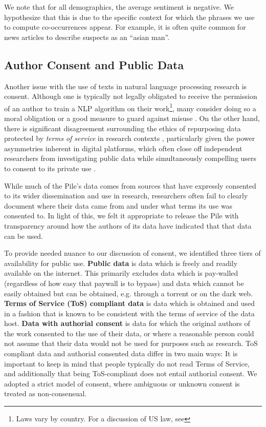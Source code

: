 \documentclass[11pt,a4paper]{article}
\begin{document}
We note that for all demographics, the average sentiment is negative. We hypothesize that this is due to the specific context for which the phrases we use to compute co-occurrences appear. For example, it is often quite common for news articles to describe suspects as an ``asian man''.


\subsection{Author Consent and Public Data}

Another issue with the use of texts in natural language processing research is consent. Although one is typically not legally obligated to receive the permission of an author to train a NLP algorithm on their work\footnote{Laws vary by country. For a discussion of US law, see }, many consider doing so a moral obligation or a good measure to guard against misuse \citep{ethics-consent,pyrrhic-cv}. On the other hand, there is significant disagreement surrounding the ethics of repurposing data protected by \textit{terms of service} in research contexts \cite{beyondthebelmont, norobots}, particularly given the power asymmetries inherent in digital platforms, which often close off independent researchers from investigating public data while simultaneously compelling users to consent to its private use \cite{overcomingtos}.

While much of the Pile's data comes from sources that have expressly consented to its wider dissemination and use in research, researchers often fail to clearly document where their data came from and under what terms its use was consented to. In light of this, we felt it appropriate to release the Pile with transparency around how the authors of its data have indicated that that data can be used.

To provide needed nuance to our discussion of consent, we identified three tiers of availability for public use. \textbf{Public data} is data which is freely and readily available on the internet. This primarily excludes data which is pay-walled (regardless of how easy that paywall is to bypass) and data which cannot be easily obtained but can be obtained, e.g. through a torrent or on the dark web. \textbf{Terms of Service (ToS) compliant data} is data which is obtained and used in a fashion that is known to be consistent with the terms of service of the data host. \textbf{Data with authorial consent} is data for which the original authors of the work consented to the use of their data, or where a reasonable person could not assume that their data would not be used for purposes such as research. ToS compliant data and authorial consented data differ in two main ways: It is important to keep in mind that people typically do not read Terms of Service, and additionally that being ToS-compliant does not entail authorial consent. We adopted a strict model of consent, where ambiguous or unknown consent is treated as non-consensual.
\end{document}
